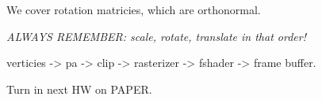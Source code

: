 \documentclass{article}
\begin{document}
We cover rotation matricies, which are orthonormal.

\emph{ALWAYS REMEMBER: scale, rotate, translate in that order!}

verticies -> pa -> clip -> rasterizer -> fshader -> frame buffer.

Turn in next HW on PAPER.
\end{document}
